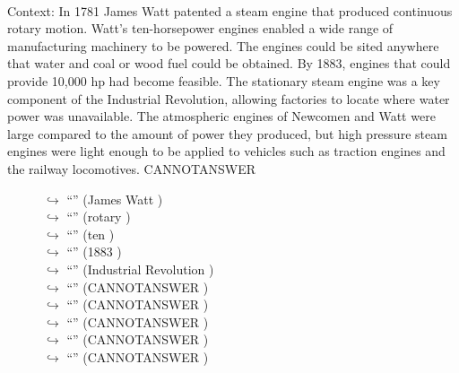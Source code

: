 \documentclass[11pt,a4paper, onecolumn]{article}
\begin{document}
\\ Context: In 1781 James Watt patented a steam engine that produced continuous rotary motion. Watt's ten-horsepower engines enabled a wide range of manufacturing machinery to be powered. The engines could be sited anywhere that water and coal or wood fuel could be obtained. By 1883, engines that could provide 10,000 hp had become feasible. The stationary steam engine was a key component of the Industrial Revolution, allowing factories to locate where water power was unavailable. The atmospheric engines of Newcomen and Watt were large compared to the amount of power they produced, but high pressure steam engines were light enough to be applied to vehicles such as traction engines and the railway locomotives. CANNOTANSWER

\begin{figure}[t] \small \begin{tcolorbox}[boxsep=0pt,left=5pt,right=0pt,top=2pt,colback = yellow!5] \begin{dialogue}
 \small 
\colorbox{pink!25}{$\hookrightarrow$}
{ ``'' (James Watt ) }
\\
\colorbox{pink!25}{$\hookrightarrow$}
{ ``'' (rotary ) }
\\
\colorbox{pink!25}{$\hookrightarrow$}
{ ``'' (ten ) }
\\
\colorbox{pink!25}{$\hookrightarrow$}
{ ``'' (1883 ) }
\\
\colorbox{pink!25}{$\hookrightarrow$}
{ ``'' (Industrial Revolution ) }
\\
\colorbox{pink!25}{$\hookrightarrow$}
{ ``'' (CANNOTANSWER ) }
\\
\colorbox{pink!25}{$\hookrightarrow$}
{ ``'' (CANNOTANSWER ) }
\\
\colorbox{pink!25}{$\hookrightarrow$}
{ ``'' (CANNOTANSWER ) }
\\
\colorbox{pink!25}{$\hookrightarrow$}
{ ``'' (CANNOTANSWER ) }
\\
\colorbox{pink!25}{$\hookrightarrow$}
{ ``'' (CANNOTANSWER ) }
\\
 \end{dialogue}\end{tcolorbox}\end{figure}
\end{document}
